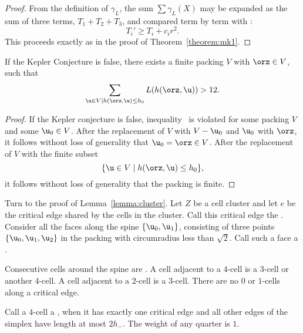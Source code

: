 \begin{proof}
From the definition of $\gamma_L$, the sum $\sum \gamma_L(X)$ may be
expanded as the sum of three terms, $T_1+T_2+T_3$, and compared term
by term with :
\begin{displaymath}
T_i' \ge T_i + c_i r^2.
\end{displaymath}
This proceeds exactly as in the proof of Theorem~\ref{theorem:mk1}.
\end{proof}

\begin{corollary}\label{cor:CE} If the Kepler Conjecture is false,
there exists a finite packing $ V$ with $\orz\in V$, such that
\begin{equation}\label{eqn:CE}
\sum_{ \u\in V \mid h(\orz, \u)\le h_0} L(h(\orz, \u)) > 12.
\end{equation}
\end{corollary}

\begin{proof} If the Kepler conjecture is false,
inequality~ is violated for some packing $ V$ and some
$ \u_0\in V$.  After the replacement of $ V$ with $ V - \u_0$ and $
\u_0$ with $\orz$, it follows without loss of generality that $
\u_0=\orz\in V$.  After the replacement of $ V$ with the finite
subset
\begin{displaymath}
\{ \u\in V\mid h(\orz, \u)\le h_0\},
\end{displaymath}
it follows without loss of generality that the packing is finite.
\end{proof}


Turn to the proof of Lemma~\ref{lemma:cluster}.  Let $Z$ be a cell
cluster and let $e$ be the critical edge shared by the cells in the
cluster.  Call this critical edge the .  Consider all
the faces along the spine $\{ \u_0, \u_1\}$, consisting of three
points $\{ \u_0, \u_1, \u_2\}$ in the packing with circumradius less
than $\sqrt2$.  Call such a face a . 
%
%
%

Consecutive cells around the spine are .  A cell
adjacent to a $4$-cell is a $3$-cell or another $4$-cell.  A cell
adjacent to a $2$-cell is a $3$-cell.  There are no $0$ or $1$-cells
along a critical edge.  %
%

Call a $4$-cell a , when it has exactly one critical
edge and all other edges of the simplex have length at most $2 h_-$.
The weight of any quarter is $1$.


